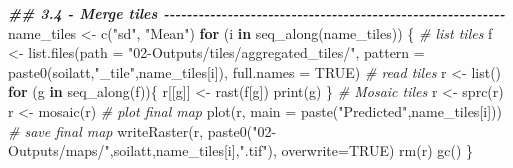 \documentclass[
  10pt,
  b5paper,
  oneside]{book}
\newenvironment{Shaded}{\begin{snugshade}}{\end{snugshade}}
\newcommand{\AttributeTok}[1]{\textcolor[rgb]{0.77,0.63,0.00}{#1}}
\newcommand{\CommentTok}[1]{\textcolor[rgb]{0.56,0.35,0.01}{\textit{#1}}}
\newcommand{\ConstantTok}[1]{\textcolor[rgb]{0.00,0.00,0.00}{#1}}
\newcommand{\ControlFlowTok}[1]{\textcolor[rgb]{0.13,0.29,0.53}{\textbf{#1}}}
\newcommand{\DocumentationTok}[1]{\textcolor[rgb]{0.56,0.35,0.01}{\textbf{\textit{#1}}}}
\newcommand{\FunctionTok}[1]{\textcolor[rgb]{0.00,0.00,0.00}{#1}}
\newcommand{\NormalTok}[1]{#1}
\newcommand{\OtherTok}[1]{\textcolor[rgb]{0.56,0.35,0.01}{#1}}
\newcommand{\StringTok}[1]{\textcolor[rgb]{0.31,0.60,0.02}{#1}}
\begin{document}
\begin{Shaded}
\begin{Highlighting}[]
\DocumentationTok{\#\# 3.4 {-} Merge tiles {-}{-}{-}{-}{-}{-}{-}{-}{-}{-}{-}{-}{-}{-}{-}{-}{-}{-}{-}{-}{-}{-}{-}{-}{-}{-}{-}{-}{-}{-}{-}{-}{-}{-}{-}{-}{-}{-}{-}{-}{-}{-}{-}{-}{-}{-}{-}{-}{-}{-}{-}{-}{-}{-}{-}{-}{-}{-}{-} }
\NormalTok{name\_tiles }\OtherTok{\textless{}{-}} \FunctionTok{c}\NormalTok{(}\StringTok{"sd"}\NormalTok{, }\StringTok{"Mean"}\NormalTok{)}
\ControlFlowTok{for}\NormalTok{ (i }\ControlFlowTok{in} \FunctionTok{seq\_along}\NormalTok{(name\_tiles)) \{}
  \CommentTok{\# list tiles }
\NormalTok{  f }\OtherTok{\textless{}{-}} \FunctionTok{list.files}\NormalTok{(}\AttributeTok{path =} \StringTok{"02{-}Outputs/tiles/aggregated\_tiles/"}\NormalTok{, }
                  \AttributeTok{pattern =} \FunctionTok{paste0}\NormalTok{(soilatt,}\StringTok{"\_tile"}\NormalTok{,name\_tiles[i]), }
                  \AttributeTok{full.names =} \ConstantTok{TRUE}\NormalTok{)}
  \CommentTok{\# read tiles}
\NormalTok{  r }\OtherTok{\textless{}{-}} \FunctionTok{list}\NormalTok{()}
  \ControlFlowTok{for}\NormalTok{ (g }\ControlFlowTok{in} \FunctionTok{seq\_along}\NormalTok{(f))\{}
\NormalTok{    r[[g]] }\OtherTok{\textless{}{-}} \FunctionTok{rast}\NormalTok{(f[g])}
    \FunctionTok{print}\NormalTok{(g)}
\NormalTok{  \}}
  \CommentTok{\# Mosaic tiles}
\NormalTok{  r }\OtherTok{\textless{}{-}} \FunctionTok{sprc}\NormalTok{(r)}
\NormalTok{  r }\OtherTok{\textless{}{-}} \FunctionTok{mosaic}\NormalTok{(r)}
  \CommentTok{\# plot final map}
  \FunctionTok{plot}\NormalTok{(r, }\AttributeTok{main =} \FunctionTok{paste}\NormalTok{(}\StringTok{"Predicted"}\NormalTok{,name\_tiles[i]))}
  \CommentTok{\# save final map}
  \FunctionTok{writeRaster}\NormalTok{(r, }\FunctionTok{paste0}\NormalTok{(}\StringTok{"02{-}Outputs/maps/"}\NormalTok{,soilatt,name\_tiles[i],}\StringTok{".tif"}\NormalTok{),}
              \AttributeTok{overwrite=}\ConstantTok{TRUE}\NormalTok{)}
  \FunctionTok{rm}\NormalTok{(r)}
  \FunctionTok{gc}\NormalTok{()}
\NormalTok{\}}


\end{Highlighting}
\end{Shaded}
\end{document}
